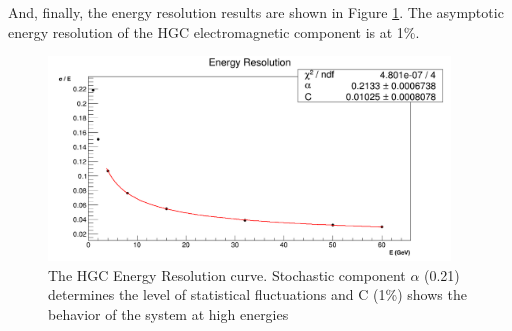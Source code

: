 And, finally, the energy resolution results are shown in Figure \ref{fig:simulations_hgc_pbresolution}. The asymptotic energy resolution of the HGC electromagnetic component is at 1\%.
 \begin{figure}[htbp]
    \centering
    \includegraphics[width=0.95\textwidth]{figures/ch_simulations/hgc/performance/Pb/Resolution.png}
    \caption{The {\sc HGC} Energy Resolution curve. Stochastic component $\alpha$ (0.21) determines the level of statistical fluctuations and C (1\%) shows the behavior of the system at high energies}
    \label{fig:simulations_hgc_pbresolution}
 \end{figure}